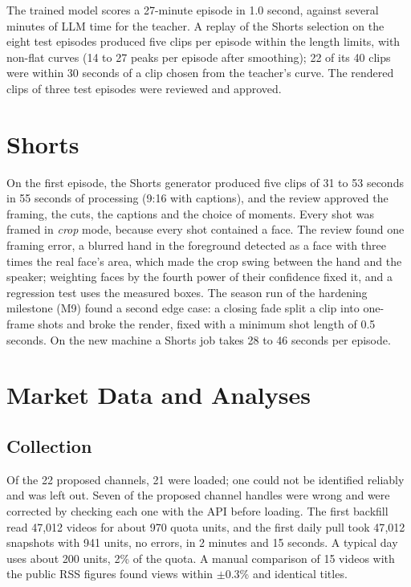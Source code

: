 The trained model scores a 27-minute episode in 1.0 second, against several minutes of LLM time for the teacher. A replay of the Shorts selection on the eight test episodes produced five clips per episode within the length limits, with non-flat curves (14 to 27 peaks per episode after smoothing); 22 of its 40 clips were within 30 seconds of a clip chosen from the teacher's curve. The rendered clips of three test episodes were reviewed and approved.

\section{Shorts}

On the first episode, the Shorts generator produced five clips of 31 to 53 seconds in 55 seconds of processing (9:16 with captions), and the review approved the framing, the cuts, the captions and the choice of moments. Every shot was framed in \textit{crop} mode, because every shot contained a face. The review found one framing error, a blurred hand in the foreground detected as a face with three times the real face's area, which made the crop swing between the hand and the speaker; weighting faces by the fourth power of their confidence fixed it, and a regression test uses the measured boxes. The season run of the hardening milestone (M9) found a second edge case: a closing fade split a clip into one-frame shots and broke the render, fixed with a minimum shot length of 0.5 seconds. On the new machine a Shorts job takes 28 to 46 seconds per episode.

\section{Market Data and Analyses}

\subsection*{Collection}

Of the 22 proposed channels, 21 were loaded; one could not be identified reliably and was left out. Seven of the proposed channel handles were wrong and were corrected by checking each one with the API before loading. The first backfill read 47{,}012 videos for about 970 quota units, and the first daily pull took 47{,}012 snapshots with 941 units, no errors, in 2 minutes and 15 seconds. A typical day uses about 200 units, 2\% of the quota. A manual comparison of 15 videos with the public RSS figures found views within $\pm$0.3\% and identical titles.

